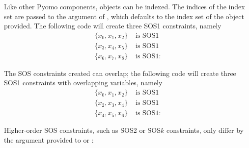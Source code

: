     Like other Pyomo components,  objects can be
    indexed. The indices of the index set are passed to the argument
    of , which defaults to the index set of the 
    object provided. The following code will create three SOS1
    constraints, namely
    \begin{equation*}
      \begin{aligned}
	\{x_0, x_1, x_2\} & \text{~is SOS1} \\
	\{x_3, x_4, x_5\} & \text{~is SOS1} \\
	\{x_6, x_7, x_8\} & \text{~is SOS1}:
      \end{aligned}
    \end{equation*}
    

    The SOS constraints created can overlap; the following code will
    create three SOS1 constraints with overlapping variables, namely
    \begin{equation*}
      \begin{aligned}
	\{x_0, x_1, x_2\} & \text{~is SOS1} \\
	\{x_2, x_3, x_4\} & \text{~is SOS1} \\
	\{x_4, x_5, x_6\} & \text{~is SOS1}:
      \end{aligned}
    \end{equation*}
    

    Higher-order SOS constraints, such as SOS2 or SOS$k$ constraints,
    only differ by the argument provided to  or
    :
    

    
